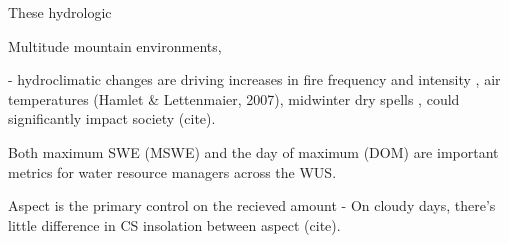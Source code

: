 These hydrologic 

Multitude mountain environments, 


- hydroclimatic changes are driving increases in fire frequency and intensity \citep{abatzoglouImpactAnthropogenicClimate2016}, air temperatures (Hamlet \& Lettenmaier, 2007), midwinter dry spells \citep{hatchettMidwinterDrySpells2023}, could significantly impact society (cite). 


Both maximum SWE (MSWE) and the day of maximum (DOM) are important metrics for water resource managers across the WUS.

Aspect is the primary control on the recieved amount 
-	On cloudy days, there’s little difference in CS insolation between aspect (cite). 




 

